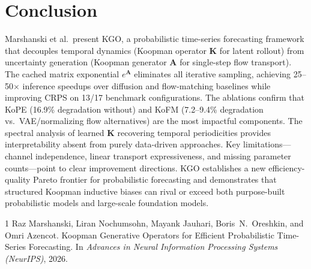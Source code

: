 \documentclass[11pt,a4paper]{article}
\begin{document}
\section{Conclusion}
Marshanski et al.\ present KGO, a probabilistic time-series forecasting framework that decouples temporal dynamics (Koopman operator $\mathbf{K}$ for latent rollout) from uncertainty generation (Koopman generator $\mathbf{A}$ for single-step flow transport). The cached matrix exponential $e^{\mathbf{A}}$ eliminates all iterative sampling, achieving 25--50$\times$ inference speedups over diffusion and flow-matching baselines while improving CRPS on 13/17 benchmark configurations. The ablations confirm that KoPE (16.9\% degradation without) and KoFM (7.2--9.4\% degradation vs.\ VAE/normalizing flow alternatives) are the most impactful components. The spectral analysis of learned $\mathbf{K}$ recovering temporal periodicities provides interpretability absent from purely data-driven approaches. Key limitations---channel independence, linear transport expressiveness, and missing parameter counts---point to clear improvement directions. KGO establishes a new efficiency-quality Pareto frontier for probabilistic forecasting and demonstrates that structured Koopman inductive biases can rival or exceed both purpose-built probabilistic models and large-scale foundation models.


\begin{thebibliography}{1}
Raz Marshanski, Liran Nochumsohn, Mayank Jauhari, Boris~N.\ Oreshkin, and Omri Azencot.
\newblock Koopman Generative Operators for Efficient Probabilistic Time-Series Forecasting.
\newblock In \emph{Advances in Neural Information Processing Systems (NeurIPS)}, 2026.
\end{thebibliography}
\end{document}

